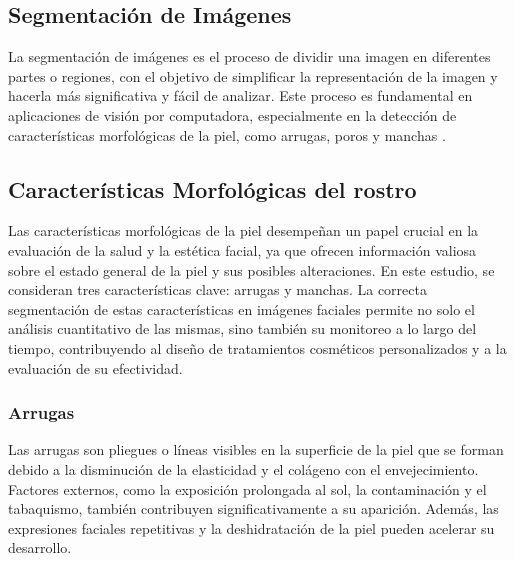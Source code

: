 
\subsection{Segmentación de Imágenes}
La segmentación de imágenes es el proceso de dividir una imagen en diferentes partes o regiones, con el objetivo de simplificar la representación de la imagen y hacerla más significativa y fácil de analizar. Este proceso es fundamental en aplicaciones de visión por computadora, especialmente en la detección de características morfológicas de la piel, como arrugas, poros y manchas \parencite{autor2020segmentacion}.

\subsection{Características Morfológicas del rostro}
Las características morfológicas de la piel desempeñan un papel crucial en la evaluación de la salud y la estética facial, ya que ofrecen información valiosa sobre el estado general de la piel y sus posibles alteraciones. En este estudio, se consideran tres características clave: arrugas y manchas. La correcta segmentación de estas características en imágenes faciales permite no solo el análisis cuantitativo de las mismas, sino también su monitoreo a lo largo del tiempo, contribuyendo al diseño de tratamientos cosméticos personalizados y a la evaluación de su efectividad. \parencite{autor2021arrugas}

\subsubsection{Arrugas}
Las arrugas son pliegues o líneas visibles en la superficie de la piel que se forman debido a la disminución de la elasticidad y el colágeno con el envejecimiento. Factores externos, como la exposición prolongada al sol, la contaminación y el tabaquismo, también contribuyen significativamente a su aparición. Además, las expresiones faciales repetitivas y la deshidratación de la piel pueden acelerar su desarrollo. \parencite{autor2021arrugas}

